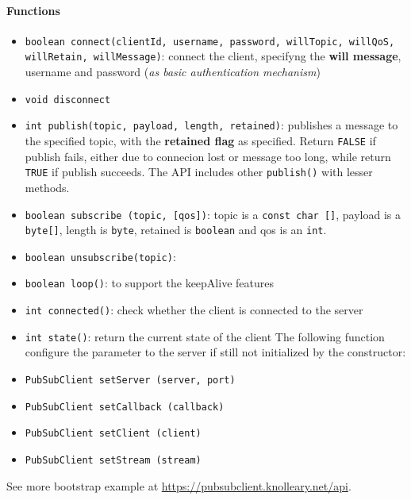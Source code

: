 \documentclass[10pt,a4paper]{report}
\theoremstyle{definition}
\begin{document}
\paragraph{Functions}\label{sec:functions}\begin{itemize}
	\item 
	\texttt{boolean connect(clientId, username, password, willTopic, willQoS, willRetain, willMessage)}: connect the client, specifyng the \textbf{will message}, username and password (\textit{as basic authentication mechanism})
	\item 
	\texttt{void disconnect}
	\item 
	\texttt{int publish(topic, payload, length, retained)}: publishes a message to the specified topic, with the \textbf{retained flag} as specified. Return \texttt{FALSE} if publish fails, either due to connecion lost or message too long, while return \texttt{TRUE} if publish succeeds. The API includes other \texttt{publish()} with lesser methods.
	\item 
	\texttt{boolean subscribe (topic, [qos])}: topic is a \texttt{const char []}, payload is a \texttt{byte[]}, length is \texttt{byte}, retained is \texttt{boolean} and qos is an \texttt{int}.
	\item 
	\texttt{boolean unsubscribe(topic)}:
	\item 
	\texttt{boolean loop()}: to support the keepAlive features
	\item 
	\texttt{int connected()}: check whether the client is connected to the server
	\item 
	\texttt{int state()}: return the current state of the client
	The following function configure the parameter to the server if still not initialized by the constructor:
	\item 
	\texttt{PubSubClient setServer (server, port)}
	\item 
	\texttt{PubSubClient setCallback (callback)}
	\item 
	\texttt{PubSubClient setClient (client)}
	\item 
	\texttt{PubSubClient setStream (stream)}

\end{itemize}

	See more bootstrap example at \href{https://pubsubclient.knolleary.net/api}{https://pubsubclient.knolleary.net/api}.
\end{document}
